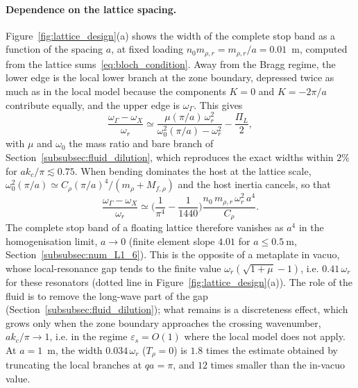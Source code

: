\paragraph{Dependence on the lattice spacing.} Figure~\ref{fig:lattice_design}(a) shows the width of the complete stop band as a function of the spacing $a$, at fixed loading $n_0m_{\rho,r}=m_{\rho,r}/a=0.01$~m, computed from the lattice sums~\eqref{eq:bloch_condition}. Away from the Bragg regime, the lower edge is the local lower branch at the zone boundary, depressed twice as much as in the local model because the components $K=0$ and $K=-2\pi/a$ contribute equally, and the upper edge is $\omega_\Gamma$. This gives
\begin{equation}\label{eq:gap_asymptotic}
    \frac{\omega_\Gamma-\omega_X}{\omega_r}\simeq\frac{\mu(\pi/a)\,\omega_r^2}{\omega_0^2(\pi/a)-\omega_r^2}-\frac{\Pi_L}{2},
\end{equation}
with $\mu$ and $\omega_0$ the mass ratio and bare branch of Section~\ref{subsubsec:fluid_dilution}, which reproduces the exact widths within $2\%$ for $ak_c/\pi\lesssim0.75$. When bending dominates the host at the lattice scale, $\omega_0^2(\pi/a)\simeq C_\rho(\pi/a)^4/(m_\rho+M_{f,\rho})$ and the host inertia cancels, so that
\begin{equation}\label{eq:gap_a4}
    \frac{\omega_\Gamma-\omega_X}{\omega_r}\simeq\Big(\frac{1}{\pi^4}-\frac{1}{1440}\Big)\frac{n_0\,m_{\rho,r}\,\omega_r^2\,a^4}{C_\rho}.
\end{equation}
The complete stop band of a floating lattice therefore vanishes as $a^4$ in the homogenisation limit, $a\to0$ {\color{red}(finite element slope $4.01$ for $a\le0.5~\si{\meter}$, Section~\ref{subsubsec:num_L1_6})}. This is the opposite of a metaplate in vacuo, whose local-resonance gap tends to the finite value $\omega_r(\sqrt{1+\mu}-1)$, i.e. $0.41\,\omega_r$ for these resonators (dotted line in Figure~\ref{fig:lattice_design}(a)). The role of the fluid is to remove the long-wave part of the gap (Section~\ref{subsubsec:fluid_dilution}); what remains is a discreteness effect, which grows only when the zone boundary approaches the crossing wavenumber, $ak_c/\pi\to1$, i.e. in the regime $\varepsilon_s=O(1)$ where the local model does not apply. At $a=1$~m, the width $0.034\,\omega_r$ ($T_\rho=0$) is $1.8$ times the estimate obtained by truncating the local branches at $qa=\pi$, and $12$ times smaller than the in-vacuo value.

